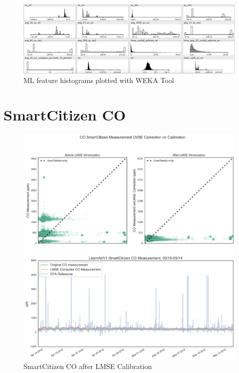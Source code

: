 \begin{figure}[htb]
	\includegraphics[width=\textwidth]{weka/features4}                 
         \caption{ML feature histograms plotted with WEKA Tool}
 	 \label{fig:weka_features}
\end{figure}

\FloatBarrier
\section{SmartCitizen CO}
\FloatBarrier

\begin{figure}[htb]
 	\includegraphics[width=\textwidth]{figs/sck_co_lmse}               
 	 \caption{SmartCitizen CO after LMSE Calibration}
  	\label{fig:sck_co_lmse}
\end{figure}


